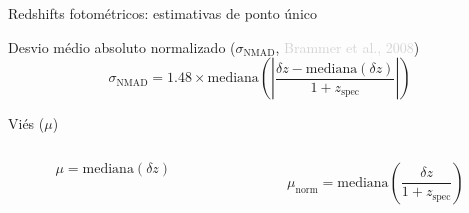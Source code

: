 \begin{frame}[c]{Redshifts fotométricos: estimativas de ponto único}
    \begin{splusbox}{Desvio médio absoluto normalizado ($\sigma_\text{NMAD}${, \textcolor{LightGray}{Brammer et al., 2008}})}
        \begin{equation*}
            \sigma_\text{NMAD} = 1.48 \times \text{mediana} \left( \left| \frac{{\delta z} - \text{mediana}(\delta z)}{1+z_\text{spec}} \right| \right)
        \end{equation*}
    \end{splusbox}


    \begin{splusbox}{Viés ($\mu$)}
        \vspace{-.5cm}
        \begin{columns}[c]
            \begin{column}{0.46\textwidth}
                \centering
                \begin{equation*}
                    \mu = \text{mediana} \left( \delta z \right)
                \end{equation*}
            \end{column}
            \begin{column}{0.46\textwidth}
                \centering
                \begin{equation*}
                    \mu_\text{norm} = \text{mediana} \left( \frac{\delta z}{1+z_{\text{spec}}} \right)
                \end{equation*}
            \end{column}
            \hspace*{1cm}
        \end{columns}
    \end{splusbox}


\end{frame}
